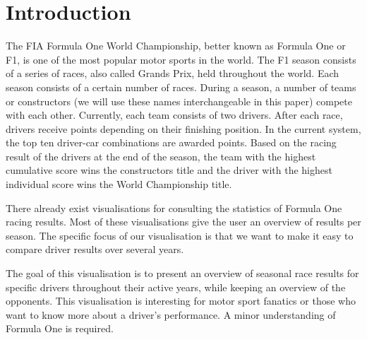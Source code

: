 \documentclass{sigchi}
\begin{document}












\section{Introduction}
The FIA Formula One World Championship, better known as Formula One or F1, is one of the most popular motor sports in the world. The F1 season consists of a series of races, also called Grands Prix, held throughout the world. Each season consists of a certain number of races. During a season, a number of teams or constructors (we will use these names interchangeable in this paper) compete with each other. Currently, each team consists of two drivers. After each race, drivers receive points depending on their finishing position. In the current system, the top ten driver-car combinations are awarded points. Based on the racing result of the drivers at the end of the season, the team with the highest cumulative score wins the constructors title and the driver with the highest individual score wins the World Championship title.
 
There already exist visualisations for consulting the statistics of Formula One racing results\cite{lapchart}\cite{spenke2000infozoom}. Most of these visualisations give the user an overview of results per season. The specific focus of our visualisation is that we want to make it easy to compare driver results over several years.
 
The goal of this visualisation is to present an overview of seasonal race results for specific drivers throughout their active years, while keeping an overview of the opponents. This visualisation is interesting for motor sport fanatics or those who want to know more about a driver’s performance. A minor understanding of Formula One is required.
 
\end{document}
